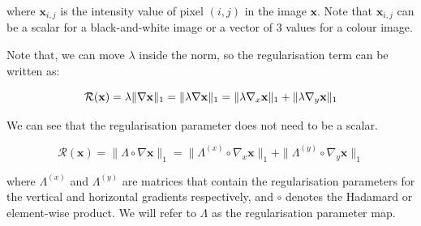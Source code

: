\documentclass[12pt]{article}
\begin{document}

where $\mathbf{x}_{i,j}$ is the intensity value of pixel $(i,j)$ in the image $\mathbf{x}$. Note that $\mathbf{x}_{i,j}$ can be a scalar for a black-and-white image or a vector of 3 values for a colour image.

Note that, we can move $\lambda$ inside the norm, so the regularisation term can be written as:

\begin{equation}
    \mathcal{R}(\mathbf{x}) 
    = \lambda \| \nabla \mathbf{x} \|_1 \\
    = \| \lambda \nabla \mathbf{x} \|_1 \\
    = \| \lambda \nabla_x \mathbf{x} \|_1 + \| \lambda \nabla_y \mathbf{x} \|_1
\end{equation}


We can see that the regularisation parameter does not need to be a scalar.




\begin{equation}
  \mathcal{R}(\mathbf{x}) = \| \Lambda \circ \nabla \mathbf{x} \|_1
  = \| \Lambda^{(x)} \circ \nabla_x \mathbf{x} \|_1 + \| \Lambda^{(y)} \circ \nabla_y \mathbf{x} \|_1
\end{equation}

where $\Lambda^{(x)}$ and $\Lambda^{(y)}$ are matrices that contain the regularisation parameters for the vertical and horizontal gradients respectively, and $\circ$ denotes the Hadamard or element-wise product.
We will refer to $\Lambda$ as the regularisation parameter map.
\end{document}
